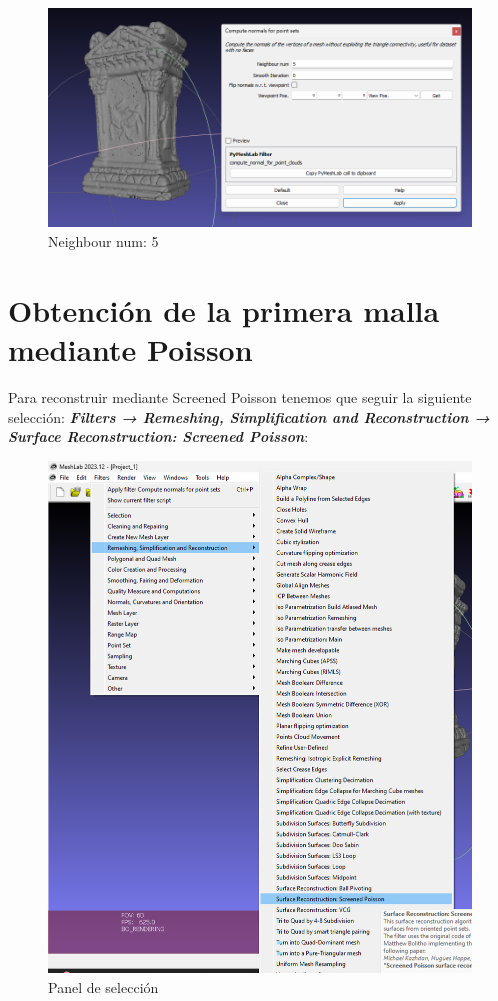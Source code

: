 \documentclass{article}
\begin{document}
\begin{figure}[H]
    \centering
    \includegraphics[scale=0.44]{images/normales_02.png}
    \caption{Neighbour num: 5}
\end{figure}

\section{Obtención de la primera malla mediante Poisson}

Para reconstruir mediante Screened Poisson tenemos que seguir la siguiente selección: \textbf{\textit{Filters → Remeshing, Simplification and Reconstruction → Surface Reconstruction: Screened Poisson}}:

\begin{figure}[H]
    \centering
    \includegraphics[scale=0.44]{images/poisson_01.png}
    \caption{Panel de selección}
\end{figure}
\end{document}
